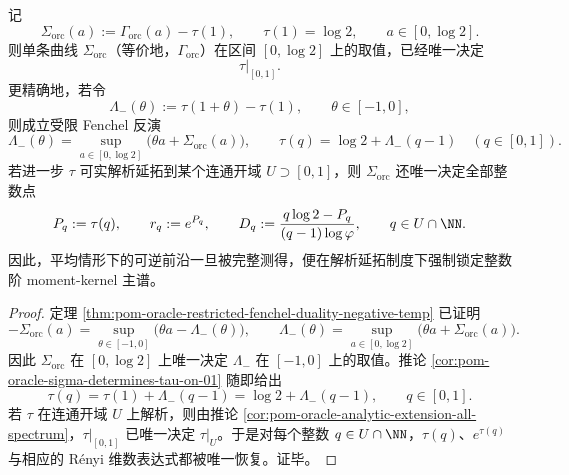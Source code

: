 \begin{theorem}[单曲线谱层析完备性]\label{thm:conclusion-oracle-singlecurve-tomography-completeness}
记
\[
\Sigma_{\mathrm{orc}}(a):=\Gamma_{\mathrm{orc}}(a)-\tau(1),
\qquad
\tau(1)=\log 2,
\qquad
a\in[0,\log 2].
\]
则单条曲线 \(\Sigma_{\mathrm{orc}}\)（等价地，\(\Gamma_{\mathrm{orc}}\)）在区间 \([0,\log 2]\) 上的取值，已经唯一决定
\[
\tau|_{[0,1]}.
\]
更精确地，若令
\[
\Lambda_-(\theta):=\tau(1+\theta)-\tau(1),
\qquad
\theta\in[-1,0],
\]
则成立受限 Fenchel 反演
\[
\Lambda_-(\theta)=\sup_{a\in[0,\log 2]}\bigl(\theta a+\Sigma_{\mathrm{orc}}(a)\bigr),
\qquad
\tau(q)=\log 2+\Lambda_-(q-1)
\quad (q\in[0,1]).
\]
若进一步 \(\tau\) 可实解析延拓到某个连通开域 \(U\supset [0,1]\)，则 \(\Sigma_{\mathrm{orc}}\) 还唯一决定全部整数点
\[
P_q:=\tau(q),
\qquad
r_q:=e^{P_q},
\qquad
D_q:=\frac{q\log 2-P_q}{(q-1)\log\varphi},
\qquad
q\in U\cap\NN.
\]
因此，平均情形下的可逆前沿一旦被完整测得，便在解析延拓制度下强制锁定整数阶 moment-kernel 主谱。
\end{theorem}
\begin{proof}
定理 \ref{thm:pom-oracle-restricted-fenchel-duality-negative-temp} 已证明
\[
-\Sigma_{\mathrm{orc}}(a)=\sup_{\theta\in[-1,0]}\bigl(\theta a-\Lambda_-(\theta)\bigr),
\qquad
\Lambda_-(\theta)=\sup_{a\in[0,\log 2]}\bigl(\theta a+\Sigma_{\mathrm{orc}}(a)\bigr).
\]
因此 \(\Sigma_{\mathrm{orc}}\) 在 \([0,\log2]\) 上唯一决定 \(\Lambda_-\) 在 \([-1,0]\) 上的取值。推论 \ref{cor:pom-oracle-sigma-determines-tau-on-01} 随即给出
\[
\tau(q)=\tau(1)+\Lambda_-(q-1)=\log2+\Lambda_-(q-1),
\qquad q\in[0,1].
\]
若 \(\tau\) 在连通开域 \(U\) 上解析，则由推论 \ref{cor:pom-oracle-analytic-extension-all-spectrum}，\(\tau|_{[0,1]}\) 已唯一决定 \(\tau|_U\)。于是对每个整数 \(q\in U\cap\NN\)，\(\tau(q)\)、\(e^{\tau(q)}\) 与相应的 Rényi 维数表达式都被唯一恢复。证毕。
\end{proof}

